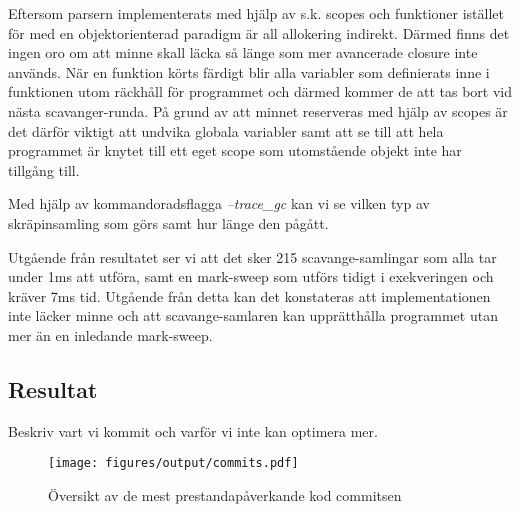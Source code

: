 Eftersom parsern implementerats med hjälp av s.k. scopes och funktioner istället
för med en objektorienterad paradigm är all allokering indirekt. Därmed finns
det ingen oro om att minne skall läcka så länge som mer avancerade closure
inte används. När en funktion körts färdigt blir alla variabler som
definierats inne i funktionen utom räckhåll för programmet och därmed kommer
de att tas bort vid nästa scavanger-runda. På grund av att minnet reserveras
med hjälp av scopes är det därför viktigt att undvika globala variabler
samt att se till att hela programmet är knytet till ett eget scope som utomstående
objekt inte har tillgång till.

Med hjälp av kommandoradsflagga \textit{--trace_gc} kan vi se vilken typ av
skräpinsamling som görs samt hur länge den pågått.

Utgående från resultatet ser vi att det sker 215 scavange-samlingar som alla
tar under 1ms att utföra, samt en mark-sweep som utförs tidigt i exekveringen
och kräver 7ms tid. Utgående från detta kan det konstateras att
implementationen inte läcker minne och att scavange-samlaren kan upprätthålla
programmet utan mer än en inledande mark-sweep.


\subsection{Resultat}

Beskriv vart vi kommit och varför vi inte kan optimera mer.

\begin{figure}[ht]
  \texttt{[image: figures/output/commits.pdf]}
  \caption{Översikt av de mest prestandapåverkande kod commitsen}
\end{figure}

